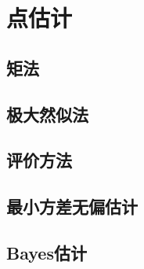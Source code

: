 \chapter{点估计}

\section{矩法}

\section{极大然似法}

\section{评价方法}

\section{最小方差无偏估计}

\section{Bayes估计}
